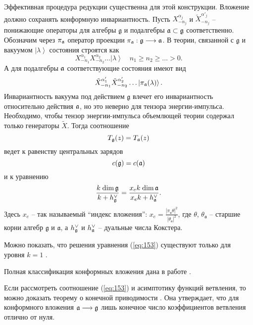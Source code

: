 Эффективная процедура редукции существенна для этой конструкции. Вложение должно сохранять конформную инвариантность. Пусть $X^{\alpha_j}_{-n_j}$ и $\tilde{X}^{\alpha'_j}_{-n_j}$ -- понижающие операторы для алгебры $\mathfrak{g}$ и подалгебры $\mathfrak{a}\subset\mathfrak{g}$ соответственно. Обозначим через $\pi_{\mathfrak{a}}$ оператор проекции $\pi_{\mathfrak{a}}:\mathfrak{g}\longrightarrow \mathfrak{a}$. В теории, связанной с $\mathfrak{g}$ и вакуумом $\left|\lambda\right>$ состояния строятся как
\begin{equation*}
  \label{eq:151}
  X^{\alpha_1}_{-n_1}X^{\alpha_2}_{-n_2}\dots\left|\lambda\right>\quad n_1\geq n_2\geq \dots>0.
\end{equation*}
А для подалгебры $\mathfrak{a}$ соответствующие состояния имеют вид
\begin{equation*}
  \label{eq:152}
  \tilde{X}^{\alpha'_1}_{-n_1}\tilde{X}^{\alpha'_2}_{-n_2}\dots\left|\pi_{\mathfrak{a}}(\lambda)\right>.
\end{equation*}
Инвариантность вакуума под действием $\mathfrak{g}$ влечет его инвариантность относительно действия $\mathfrak{a}$, но это неверно для тензора энергии-импульса. Необходимо, чтобы тензор энергии-импульса объемлющей теории содержал только генераторы $\tilde{X}$. Тогда соотношение
\begin{equation}
  \label{eq:127}
  T_{\mathfrak{g}}(z)=T_{\mathfrak{a}}(z)
\end{equation}
ведет к равенству центральных зарядов
\begin{equation*}
  \label{eq:33}
  c(\mathfrak{g})=c(\mathfrak{a})
\end{equation*}
и к уравнению
\begin{equation}
  \label{eq:153}
  \frac{k\;\mathrm{dim}\,\mathfrak{g}}{k+h^{\vee}_{\mathfrak{g}}}=\frac{x_e k\; \mathrm{dim}\,\mathfrak{a}}{x_ek+h^{\vee}_{\mathfrak{a}}}.
\end{equation}
Здесь $x_e$ -- так называемый ``индекс вложения'':
$x_e=\frac{\left|\pi_{\mathfrak{a}} \theta\right|^2}{\left|\theta_{\mathfrak{a}}\right|^2}$, где $\theta$, $\theta_{\mathfrak{a}}$ -- старшие корни алгебр
$\mathfrak{g}$ и $\mathfrak{a}$, а  $h^{\vee}_{\mathfrak{g}}$ и $h^{\vee}_{\mathfrak{a}}$ -- дуальные числа Кокстера.

Можно показать, что решения уравнения (\ref{eq:153}) существуют только для уровня $k=1$ \cite{difrancesco1997cft}.

Полная классификация конформных вложения дана в работе \cite{schellekens1986conformal}.

Если рассмотреть соотношение (\ref{eq:153}) и асимптотику функций ветвления, то можно доказать теорему о конечной приводимости \cite{kac1988modular}. Она утверждает, что для конформного вложения  $\mathfrak{a}\longrightarrow\mathfrak{g}$ лишь конечное число коэффициентов ветвления отлично от нуля.

